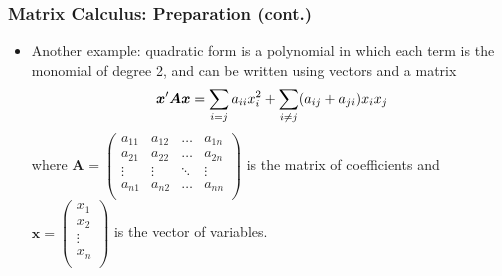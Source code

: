 \documentclass[pdflatex, 12pt]{beamer}
\begin{document}
\begin{frame}
\frametitle{Matrix Calculus: Preparation (cont.)}
\begin{itemize}
\item Another example: {\color{red} quadratic form} is a polynomial in which each term is the monomial of degree 2, and can be written using vectors and a matrix
 \begin{equation}
 \bm{x}'\bm{Ax} = \sum_{i = j} a_{ii} x_i^2 + \sum_{i \neq j} (a_{ij} + a_{ji}) x_i x_j \notag 
 \end{equation}
where {\small $\bm{A} = \begin{pmatrix}
a_{11} & a_{12} & \ldots & a_{1n} \\
a_{21} & a_{22} & \ldots & a_{2n} \\
\vdots & \vdots & \ddots & \vdots \\
a_{n1} & a_{n2} & \ldots & a_{nn} \\
\end{pmatrix}$} is the matrix of coefficients and {\small $\bm{x} = \begin{pmatrix}
x_1 \\
x_2 \\
\vdots \\
x_n \\
\end{pmatrix}$} is the vector of variables.
\end{itemize}
\end{frame}
\end{document}
